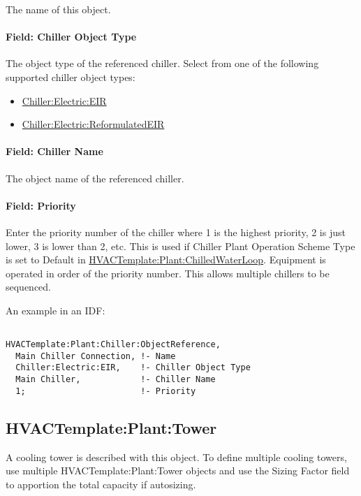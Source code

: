 The name of this object.

\paragraph{Field: Chiller Object Type}

The object type of the referenced chiller. Select from one of the following supported chiller object types:

\begin{itemize}
\item
  \hyperref[chillerelectriceir]{Chiller:Electric:EIR}
\item
  \hyperref[chillerelectricreformulatedeir]{Chiller:Electric:ReformulatedEIR}
\end{itemize}

\paragraph{Field: Chiller Name}\label{field-chiller-name}

The object name of the referenced chiller.

\paragraph{Field: Priority}\label{field-priority-1}

Enter the priority number of the chiller where 1 is the highest priority, 2 is just lower, 3 is lower than 2, etc. This is used if Chiller Plant Operation Scheme Type is set to Default in \hyperref[hvactemplateplantchilledwaterloop]{HVACTemplate:Plant:ChilledWaterLoop}. Equipment is operated in order of the priority number. This allows multiple chillers to be sequenced.

An example in an IDF:

\begin{lstlisting}

HVACTemplate:Plant:Chiller:ObjectReference,
  Main Chiller Connection, !- Name
  Chiller:Electric:EIR,    !- Chiller Object Type
  Main Chiller,            !- Chiller Name
  1;                       !- Priority
\end{lstlisting}

\subsection{HVACTemplate:Plant:Tower}\label{hvactemplateplanttower}

A cooling tower is described with this object. To define multiple cooling towers, use multiple HVACTemplate:Plant:Tower objects and use the Sizing Factor field to apportion the total capacity if autosizing.

